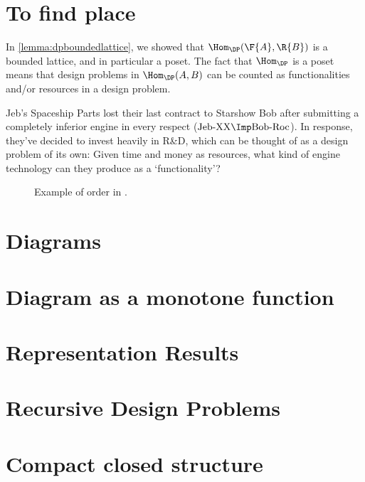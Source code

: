 \section{To find place}
\begin{remark}
In \cref{lemma:dpboundedlattice}, we showed that $\Hom_{\DP}(\F{A},\R{B})$ is a bounded lattice, and in particular a poset. The fact that $\Hom_\DP$ is a poset means that design problems in $\Hom_\DP(A,B)$ can be counted as functionalities and/or resources in a design problem.
\end{remark}

\begin{example}\label{ex:r&d}
Jeb's Spaceship Parts lost their last contract to Starshow Bob after submitting a completely inferior engine in every respect ($\text{Jeb-XX} \Imp \text{Bob-Roc}$). In response, they've decided to invest heavily in R\&D, which can be thought of as a design problem of its own: Given time and money as resources, what kind of engine technology can they produce as a `functionality'?
\end{example}

\begin{figure}[h!]
\begin{center}
\end{center}
\caption{Example of order in \DP. \label{fig:orderdp}}
\end{figure}

\section{Diagrams}
\section{Diagram as a monotone function}
\section{Representation Results}
\todo{}

\section{Recursive Design Problems}

\section{Compact closed structure}\label{sec:compact_closed}

